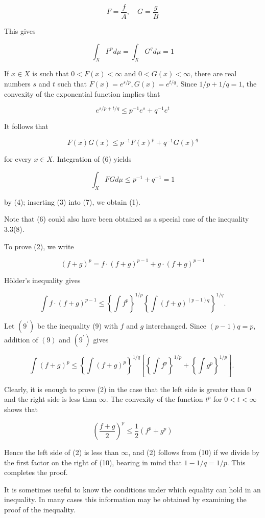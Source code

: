 \documentclass[10pt]{article}
\begin{document}
$$
F=\frac{f}{A}, \quad G=\frac{g}{B}
$$

This gives

$$
\int_{X} F^{p} d \mu=\int_{X} G^{q} d \mu=1
$$

If $x \in X$ is such that $0<F(x)<\infty$ and $0<G(x)<\infty$, there are real numbers $s$ and $t$ such that $F(x)=e^{s / p}, G(x)=e^{t / q}$. Since $1 / p+1 / q=1$, the convexity of the exponential function implies that

$$
e^{s / p+t / q} \leq p^{-1} e^{s}+q^{-1} e^{t}
$$

It follows that

$$
F(x) G(x) \leq p^{-1} F(x)^{p}+q^{-1} G(x)^{q}
$$

for every $x \in X$. Integration of (6) yields

$$
\int_{X} F G d \mu \leq p^{-1}+q^{-1}=1
$$

by (4); inserting (3) into (7), we obtain (1).

Note that (6) could also have been obtained as a special case of the inequality 3.3(8).

To prove (2), we write

$$
(f+g)^{p}=f \cdot(f+g)^{p-1}+g \cdot(f+g)^{p-1}
$$

Hölder's inequality gives

$$
\int f \cdot(f+g)^{p-1} \leq\left\{\int f^{p}\right\}^{1 / p}\left\{\int(f+g)^{(p-1) q}\right\}^{1 / q} .
$$

Let $\left(9^{\prime}\right)$ be the inequality (9) with $f$ and $g$ interchanged. Since $(p-1) q=p$, addition of $(9)$ and $\left(9^{\prime}\right)$ gives

$$
\int(f+g)^{p} \leq\left\{\int(f+g)^{p}\right\}^{1 / q}\left[\left\{\int f^{p}\right\}^{1 / p}+\left\{\int g^{p}\right\}^{1 / p}\right] \text {. }
$$

Clearly, it is enough to prove (2) in the case that the left side is greater than 0 and the right side is less than $\infty$. The convexity of the function $t^{p}$ for $0<t<\infty$ shows that

$$
\left(\frac{f+g}{2}\right)^{p} \leq \frac{1}{2}\left(f^{p}+g^{p}\right)
$$

Hence the left side of (2) is less than $\infty$, and (2) follows from (10) if we divide by the first factor on the right of (10), bearing in mind that $1-1 / q=1 / p$. This completes the proof.

It is sometimes useful to know the conditions under which equality can hold in an inequality. In many cases this information may be obtained by examining the proof of the inequality.
\end{document}
